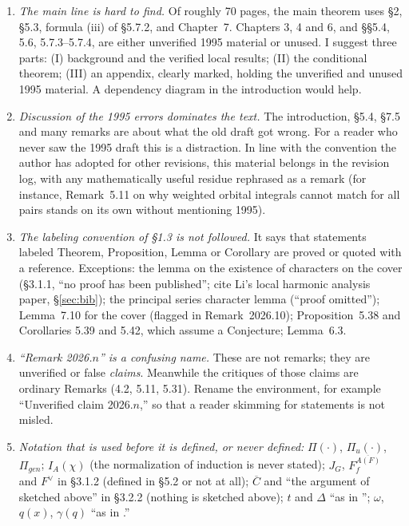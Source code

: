 \documentclass[12pt,letterpaper]{article}
\newcommand{\ov}[1]{\overline{#1}}
\theoremstyle{plain}
\begin{document}
\begin{enumerate}
\item \emph{The main line is hard to find.} Of roughly 70 pages, the main
theorem uses \S2, \S5.3, formula (iii) of \S5.7.2, and Chapter~7. Chapters
3, 4 and 6, and \S\S5.4, 5.6, 5.7.3--5.7.4, are either unverified 1995
material or unused. I suggest three parts: (I) background and the verified
local results; (II) the conditional theorem; (III) an appendix,
clearly marked, holding the unverified and unused 1995 material. A
dependency diagram in the introduction would help.

\item \emph{Discussion of the 1995 errors dominates the text.} The
introduction, \S5.4, \S7.5 and many remarks are about what the old draft
got wrong. For a reader who never saw the 1995 draft this is a
distraction. In line with the convention the author has adopted for other
revisions, this material belongs in the revision log, with any
mathematically useful residue rephrased as a remark (for instance,
Remark~5.11 on why weighted orbital integrals cannot match for all pairs
stands on its own without mentioning 1995).

\item \emph{The labeling convention of \S1.3 is not followed.} It says
that statements labeled Theorem, Proposition, Lemma or Corollary are proved
or quoted with a reference. Exceptions: the lemma on the existence of
characters on the cover (\S3.1.1, ``no proof has been published''; cite
Li's local harmonic analysis paper, \S\ref{sec:bib}); the principal series
character lemma (``proof omitted''); Lemma~7.10 for the cover (flagged in
Remark~2026.10); Proposition~5.38 and Corollaries 5.39 and 5.42, which
assume a Conjecture; Lemma~6.3.

\item \emph{``Remark 2026.$n$'' is a confusing name.} These are not
remarks; they are unverified or false \emph{claims}. Meanwhile the
critiques of those claims are ordinary Remarks (4.2, 5.11, 5.31). Rename the
environment, for example ``Unverified claim 2026.$n$,'' so that a reader
skimming for statements is not misled.

\item \emph{Notation that is used before it is defined, or never
defined:} $\Pi(\cdot)$, $\Pi_u(\cdot)$, $\Pi_{gen}$; $I_A(\chi)$ (the
normalization of induction is never stated); $J_G$, $F_f^{\ov{A(F)}}$ and
$F^\vee$ in \S3.1.2 (defined in \S5.2 or not at all); $\overline C$ and
``the argument of \cite{Ar} sketched above'' in \S3.2.2 (nothing is
sketched above); $t$ and $\Delta$ ``as in \cite{Fl}''; $\omega$, $q(x)$,
$\gamma(q)$ ``as in \cite{Fl}.''


\end{enumerate}
\end{document}

